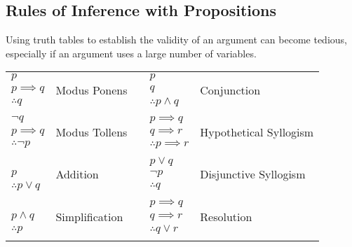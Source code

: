 \subsection{Rules of Inference with Propositions}

Using truth tables to establish the validity of an argument can become tedious, especially if an argument uses a large number of variables.

\begin{center}
  \begin{tabular}{llrll}
    $p$                   & \multirow{3}{*}{Modus Ponens}   & \quad & $p$                       & \multirow{3}{*}{Conjunction}            \\
    $p \implies q$        &                                 &       & $q$                       &                                         \\
    \hhline{-~~-~}
    $\therefore q$        &                                 &       & $\therefore p \land q$    &                                         \\
    \\
    $\lnot q$             & \multirow{3}{*}{Modus Tollens}  &       & $p \implies q$            & \multirow{3}{*}{Hypothetical Syllogism} \\
    $p \implies q$        &                                 &       & $q \implies r$            &                                         \\
    \hhline{-~~-~}
    $\therefore \lnot p$  &                                 &       & $\therefore p \implies r$ &                                         \\
    \\
                          & \multirow{3}{*}{Addition}       &       & $p \lor q$                & \multirow{3}{*}{Disjunctive Syllogism}  \\
    $p$                   &                                 &       & $\lnot p$                 &                                         \\
    \hhline{-~~-~}
    $\therefore p \lor q$ &                                 &       & $\therefore q$            &                                         \\
    \\
                          & \multirow{3}{*}{Simplification} &       & $p \implies q$            & \multirow{3}{*}{Resolution}             \\
    $p \land q$           &                                 &       & $q \implies r$            &                                         \\
    \hhline{-~~-~}
    $\therefore p$        &                                 &       & $\therefore q \lor r$     &                                         \\
    \\
  \end{tabular}
\end{center}

